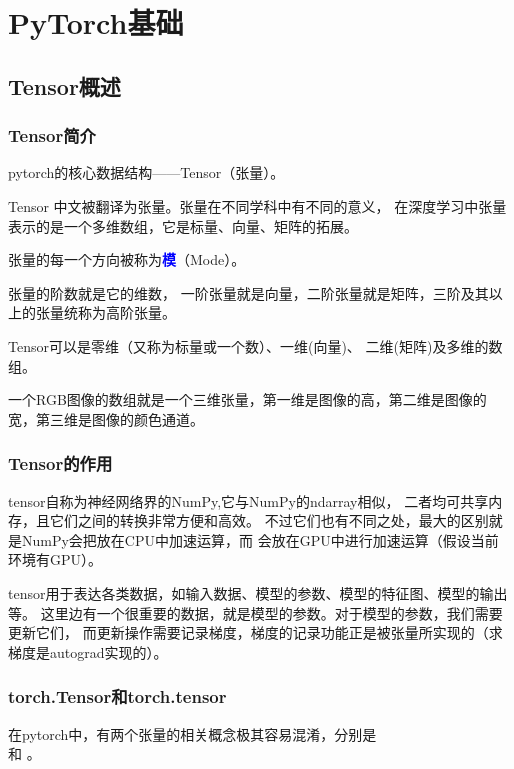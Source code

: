\chapter{PyTorch基础}
\section{Tensor概述}
\subsection{Tensor简介}
pytorch的核心数据结构——Tensor（张量）。

Tensor 中文被翻译为张量。张量在不同学科中有不同的意义，
在深度学习中张量表示的是一个多维数组，它是标量、向量、矩阵的拓展。

张量的每一个方向被称为\textcolor{blue}{\textbf{模}}（Mode）。

张量的\textcolor{YBXPurple}{阶数}就是它的\textcolor{YBXPurple}{维数}，
一阶张量就是向量，二阶张量就是矩阵，三阶及其以上的张量统称为高阶张量。

Tensor可以是零维（又称为标量或一个数）、一维(向量)、 二维(矩阵)及多维的数组。

一个RGB图像的数组就是一个三维张量，第一维是图像的高，第二维是图像的宽，第三维是图像的颜色通道。

\subsection{Tensor的作用}
tensor自称为神经网络界的NumPy,它与NumPy的ndarray相似，
二者均可共享内存，且它们之间的转换非常方便和高效。
不过它们也有不同之处，最大的区别就是NumPy会把放在CPU中加速运算，而
会放在GPU中进行加速运算（假设当前环境有GPU）。

tensor用于表达各类数据，如输入数据、模型的参数、模型的特征图、模型的输出等。
这里边有一个很重要的数据，就是模型的参数。对于模型的参数，我们需要更新它们，
而更新操作需要记录梯度，梯度的记录功能正是被张量所实现的（求梯度是autograd实现的）。

\subsection{torch.Tensor和torch.tensor}
在pytorch中，有两个张量的相关概念极其容易混淆，分别是 \\
和 。
        
